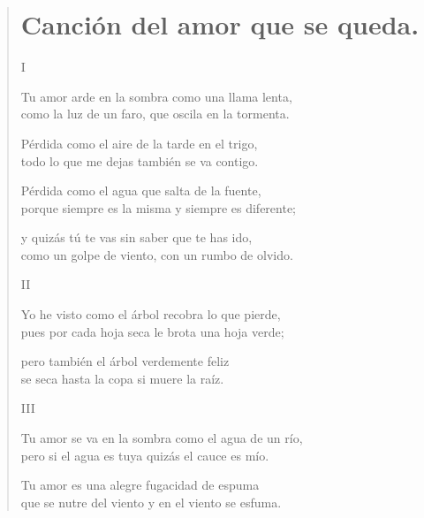 \documentclass[11pt, portrait, twoside, notitlepage, openright]{book}
\begin{document}
\newpage
\begin{verse}
\begin{center}
\section{Canción del amor que se queda.}
\end{center}

\begin{center}
    I
\end{center}

Tu amor arde en la sombra como una llama lenta,\\
como la luz de un faro, que oscila en la tormenta.
\newline

Pérdida como el aire de la tarde en el trigo,\\
todo lo que me dejas también se va contigo.
\newline

Pérdida como el agua que salta de la fuente,\\
porque siempre es la misma y siempre es diferente;
\newline

y quizás tú te vas sin saber que te has ido,\\
como un golpe de viento, con un rumbo de olvido.
\newline

\begin{center}
    II
\end{center}

Yo he visto como el árbol recobra lo que pierde,\\
pues por cada hoja seca le brota una hoja verde;
\newline

pero también el árbol verdemente feliz\\
se seca hasta la copa si muere la raíz.
\newpage

\begin{center}
    III
\end{center}

Tu amor se va en la sombra como el agua de un río,\\
pero si el agua es tuya quizás el cauce es mío.
\newline

Tu amor es una alegre fugacidad de espuma\\
que se nutre del viento y en el viento se esfuma.
\newline


\end{verse}
\end{document}
